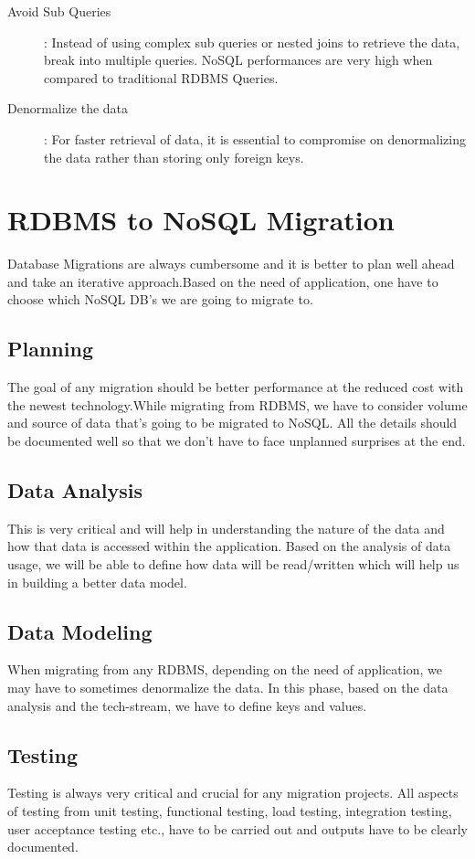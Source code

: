 \documentclass[sigconf]{acmart}
\begin{document}
\begin{description}
    \item[Avoid Sub Queries]: Instead of using complex sub queries or nested joins to retrieve the data, break into multiple queries. NoSQL performances are very high when compared to traditional RDBMS Queries.
    \item[Denormalize the data]: For faster retrieval of data, it is essential to compromise on denormalizing the data rather than storing only foreign keys.
    
\end{description}


\section{RDBMS to NoSQL Migration}
Database Migrations are always cumbersome and it is better to plan well ahead and take an iterative approach.Based on the need of application, one have to choose which NoSQL DB's we are going to migrate to. \cite{aws}
\subsection{Planning}  
The goal of any migration should be better performance at the reduced cost with the newest technology.While migrating from RDBMS, we have to consider volume and source of data that's going to be migrated to NoSQL. All the details should be documented well so that we don't have to face unplanned surprises at the end.
\subsection{Data Analysis} 
This is very critical and will help in understanding the nature of the data and how that data is accessed within the application. Based on the analysis of data usage, we will be able to define how data will be read/written which will help us in building a better data model.
\subsection{Data Modeling} 
When migrating from any RDBMS, depending on the need of application, we may have to sometimes denormalize the data. In this phase, based on the data analysis and the tech-stream, we have to define keys and values.
\subsection{Testing} 
Testing is always very critical and crucial for any migration projects. All aspects of testing from unit testing, functional testing, load testing, integration testing, user acceptance testing etc., have to be carried out and outputs have to be clearly documented. 
\end{document}
